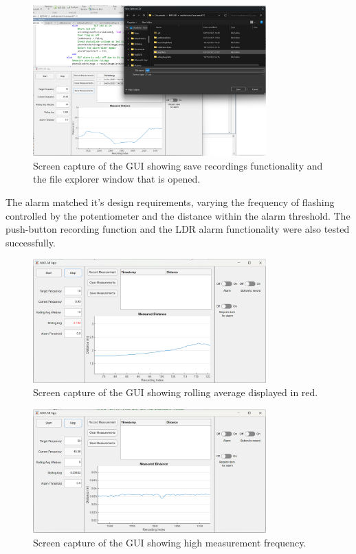 \documentclass[a4paper,12pt]{article}
\begin{document}
\begin{figure}[htbp]
    \centering
    \includegraphics[width=0.8\textwidth]{figs/task3GUI2.png}
    \caption{Screen capture of the GUI showing save recordings functionality and the file explorer window that is opened.}
    \label{fig:task3GUI2}
\end{figure}

\break

The alarm matched it's design requirements, varying the frequency of flashing controlled by the potentiometer and the distance within the alarm threshold. The push-button recording function and the LDR alarm functionality were also tested successfully.

\begin{figure}[htbp]
    \centering
    \includegraphics[width=0.8\textwidth]{figs/task3GUI3.png}
    \caption{Screen capture of the GUI showing rolling average displayed in red.}
    \label{fig:task3GUI3}
\end{figure}



\begin{figure}[htbp]
    \centering
    \includegraphics[width=0.8\textwidth]{figs/task3GUI4.png}
    \caption{Screen capture of the GUI showing high measurement frequency.}
    \label{fig:task3GUI4}
\end{figure}
\end{document}
